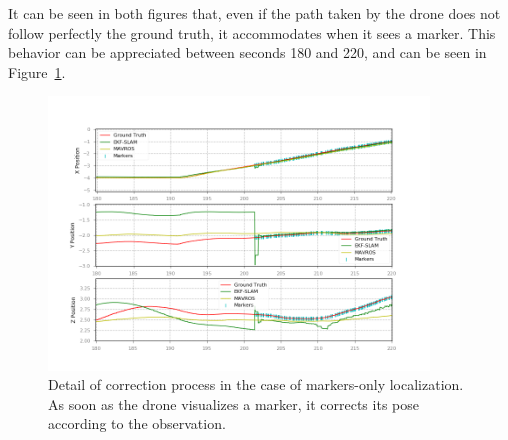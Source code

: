 It can be seen in both figures that, even if the path taken by the drone does not follow perfectly the ground truth, it accommodates when it sees a marker. This behavior can be appreciated between seconds 180 and 220, and can be seen in Figure~\ref{fig:chapter3:simulation:b:real-markers-correction-detail}.\\
\begin{figure}
    \centering
    \includegraphics[width=0.9\textwidth]{Images/fig21-real-marker-wmap-correction-detail.png}
    \caption[Detail of correction process with markers.]{Detail of correction process in the case of markers-only localization. As soon as the drone visualizes a marker, it corrects its pose according to the observation.}
    \label{fig:chapter3:simulation:b:real-markers-correction-detail}
\end{figure}

